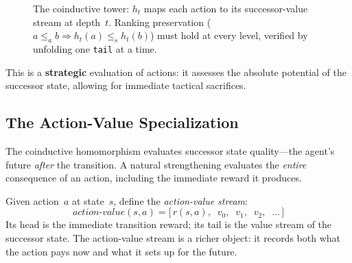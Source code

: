 \documentclass[9pt,a4paper]{article}
\theoremstyle{plain}
\theoremstyle{definition}
\theoremstyle{remark}
\begin{document}
\begin{figure}[H]
\centering
{}
\caption{The coinductive tower: $h_t$ maps each action to its successor-value stream at depth~$t$.  Ranking preservation ($a \le_a b \Rightarrow h_t(a) \le_s h_t(b)$) must hold at every level, verified by unfolding one \texttt{tail} at a time.}
\label{fig:tower}
\end{figure}

This is a \textbf{strategic} evaluation of actions: it assesses the absolute potential of the successor state, allowing for immediate tactical sacrifices.

\subsection{The Action-Value Specialization}

The coinductive homomorphism evaluates successor state quality---the agent's future \emph{after} the transition.  A natural strengthening evaluates the \emph{entire} consequence of an action, including the immediate reward it produces.

Given action~$a$ at state~$s$, define the \emph{action-value stream}:
\[
\mathit{action\text{-}value}(s,a) = \bigl[\, r(s,a),\;\; v_0,\;\; v_1,\;\; v_2,\;\; \ldots \,\bigr]
\]
Its head is the immediate transition reward; its tail is the value stream of the successor state.  The action-value stream is a richer object: it records both what the action pays now and what it sets up for the future.
\end{document}
